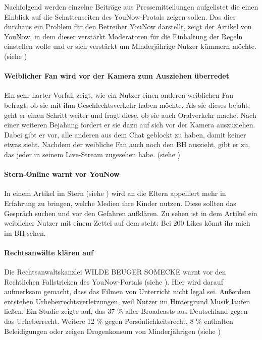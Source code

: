 Nachfolgend werden einzelne Beiträge aus Pressemitteilungen aufgelistet die einen Einblick auf die Schattenseiten des YouNow-Protals zeigen sollen. Das dies durchaus ein Problem für den Betreiber YouNow darstellt, zeigt der Artikel von YouNow, in dem dieser verstärkt Moderatoren für die Einhaltung der Regeln einstellen wolle und er sich verstärkt um Minderjährige Nutzer kümmern möchte. (siehe \cite{YTD15})

\paragraph{Weiblicher Fan wird vor der Kamera zum Ausziehen überredet}
Ein sehr harter Vorfall zeigt, wie ein Nutzer einen anderen weiblichen Fan befragt, ob sie mit ihm Geschlechtsverkehr haben möchte. Als sie dieses bejaht, geht er einen Schritt weiter und fragt diese, ob sie auch Oralverkehr mache. Nach einer weiteren Bejahung fordert er sie dazu auf sich vor der Kamera auszuziehen. Dabei gibt er vor, alle anderen aus dem Chat geblockt zu haben, damit keiner etwas sieht. Nachdem der weibliche Fan auch noch den BH auszieht, gibt er zu, das jeder in seinem Live-Stream zugesehen habe. (siehe \cite{MD10})

\paragraph{Stern-Online warnt vor YouNow}
In einem Artikel im Stern (siehe \cite{STERN15}) wird an die Eltern appelliert mehr in Erfahrung zu bringen, welche Medien ihre Kinder nutzen. Diese sollten das Gespräch suchen und vor den Gefahren aufklären. Zu sehen ist in dem Artikel ein weiblicher Nutzer mit einem Zettel auf dem steht: \glqq Bei 200 Likes könnt ihr mich im BH sehen\grqq .

\paragraph{Rechtsanwälte klären auf}
Die Rechtsanwaltskanzlei WILDE BEUGER SOMECKE warnt vor den Rechtlichen Fallstricken des YouNow-Portals (siehe \cite{WBS15}). Hier wird darauf aufmerksam gemacht, dass das Filmen von Unterricht nicht legal sei. Außerdem entstehen Urheberrechtsverletzungen, weil Nutzer im Hintergrund Musik laufen ließen. Ein Studie zeigte auf, das 37 \% aller Broadcasts aus Deutschland gegen das Urheberrecht. Weitere 12 \% gegen Persönlichkeitsrecht, 8 \% enthalten Beleidigungen oder zeigen Drogenkonsum von Minderjährigen (siehe \cite{HFMNF15})

